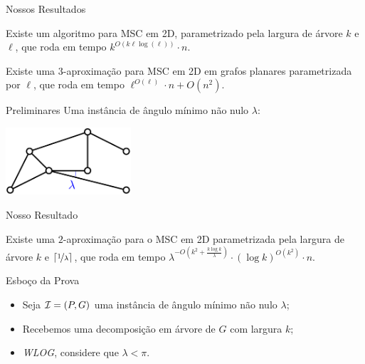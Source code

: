 \begin{frame}{Nossos Resultados}
  \begin{thm}
    Existe um algoritmo \FPT para MSC em 2D, parametrizado pela largura de árvore $k$ e $\ell$, que roda em tempo $k^{O(k \ell \log(\ell))} \cdot n$.
  \end{thm}

  \pause
  \begin{cor}
    Existe uma $3$-aproximação para MSC em 2D em grafos planares parametrizada por $\ell$, que roda em tempo $\ell^{O(\ell)} \cdot n + O(n^2)$.
  \end{cor}
\end{frame}

\begin{frame}{Preliminares}
  \centering
  Uma instância de ângulo mínimo não nulo $\lambda$:

  \bigskip
  \begin{minipage}{\linewidth}
    \centering
    \includegraphics[height=2.5cm]{MSC/lambda.png}
  \end{minipage}
\end{frame}

\begin{frame}{Nosso Resultado}
  \begin{thm}
    Existe uma $2$-aproximação para o MSC em 2D parametrizada pela largura de árvore $k$ e $\lceil \nicefrac{1}{\lambda} \rceil$, que roda em tempo $\lambda^{-O(k^2 + \frac{k \log k}{\lambda})} \cdot (\log k)^{O(k^2)} \cdot n$.
  \end{thm}
\end{frame}

\begin{frame}{Esboço da Prova}
    \begin{itemize}[<+->]
        \item Seja $\mathcal{I} = (P, G)$ uma instância de ângulo mínimo não nulo $\lambda$;

        \item Recebemos uma decomposição em árvore de $G$ com largura $k$;

        \item \emph{WLOG}, considere que $\lambda < \pi$.
    \end{itemize}
\end{frame}

